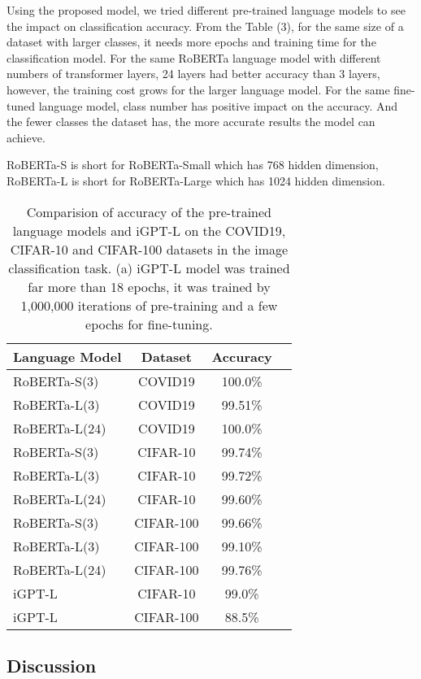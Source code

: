 \documentclass[runningheads]{llncs}
\begin{document}
Using the proposed model, we tried different pre-trained language models to see the impact on classification accuracy.
From the Table (3), for the same size of a dataset with larger classes, it needs more epochs and training time for the classification model.
For the same RoBERTa language model with different numbers of transformer layers, 24 layers had better accuracy than 3 layers,
however, the training cost grows for the larger language model.
For the same fine-tuned language model, class number has positive impact on the accuracy.
And the fewer classes the dataset has, the more accurate results the model can achieve.

\par RoBERTa-S is short for RoBERTa-Small which has 768 hidden dimension, RoBERTa-L is short for RoBERTa-Large  which has 1024 hidden dimension.

\begin{table}
\begin{center}
\begin{tabular}{|l|c|c|r|}
\hline
Language Model 	& Dataset  & Accuracy \\
\hline
\hline
RoBERTa-S(3)   & COVID19 	&	100.0\% \\
RoBERTa-L(3)  & COVID19 	&	99.51\% \\
RoBERTa-L(24)  & COVID19 	&	100.0\% \\
\hline
RoBERTa-S(3)   & CIFAR-10 	&	99.74\% \\
RoBERTa-L(3)  & CIFAR-10 	&	99.72\% \\
RoBERTa-L(24)  & CIFAR-10 	&	99.60\% \\
\hline
RoBERTa-S(3)    & CIFAR-100 	&	99.66\% \\
RoBERTa-L(3)  & CIFAR-100   & 	99.10\% \\
RoBERTa-L(24) & CIFAR-100  &	99.76\% \\
\hline\hline
iGPT-L & CIFAR-10  & 99.0\% \\
iGPT-L & CIFAR-100 & 88.5\% \\
\hline
\end{tabular}
\end{center}
\caption{Comparision of accuracy of the pre-trained language models and iGPT-L on the COVID19, CIFAR-10 and CIFAR-100 datasets in the image classification task.
    (a) iGPT-L model was trained far more than 18 epochs, it was trained by 1,000,000 iterations of pre-training and a few epochs for fine-tuning.}
\end{table}


\subsection{Discussion}
\end{document}
